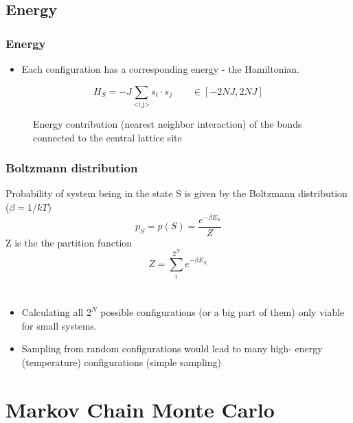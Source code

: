 \documentclass{beamer}
\newcommand{\tikzfigC}[2]{\begin{figure}[h]\begin{center}\end{center}\caption{{#2}}\end{figure}}
\begin{document}
\subsection{Energy}
\begin{frame}\frametitle{Energy}
\begin{itemize}
\item Each configuration has a corresponding energy - the Hamiltonian.
\end{itemize}\end{frame}
\begin{frame}
\begin{equation*}
H_S = -J \sum_{\text{<i,j>}}s_i\cdot s_j\qquad\in[-2NJ,2NJ]
\end{equation*}\tikzfigC{Examples}{Energy contribution (nearest neighbor interaction) of the bonds connected to the central lattice site}
\end{frame}

\begin{frame}
\frametitle{Boltzmann distribution}
 Probability of system being in the state S is given by the Boltzmann distribution ($\beta = 1/kT$) \[p_S = p(S) =\frac{ e^{-\beta E_S}}{Z}\]
 Z is the the partition function\[Z = \sum_i^{2^N} e^{-\beta E_{S_i}}\]
\end{frame}

\section*{}
\begin{frame}
\begin{itemize}
\item Calculating all $2^N$ possible configurations (or a big part of them) only viable for small systems.
\item Sampling from random configurations would lead to many high- energy (temperature) configurations (simple sampling)
\end{itemize}

\end{frame}

\section{Markov Chain Monte Carlo}
\end{document}
